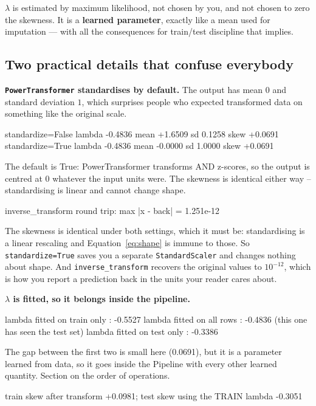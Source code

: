 \documentclass[11pt]{article}
\begin{document}
\begin{keyidea}
$\lambda$ is estimated by maximum likelihood, not chosen by you, and not chosen
to zero the skewness. It is a \textbf{learned parameter}, exactly like a mean
used for imputation --- with all the consequences for train/test discipline
that implies.
\end{keyidea}

\subsection{Two practical details that confuse everybody}

\textbf{\texttt{PowerTransformer} standardises by default.} The output has mean
$0$ and standard deviation $1$, which surprises people who expected transformed
data on something like the original scale.

\begin{codeout}
standardize=False  lambda -0.4836   mean    +1.6509   sd   0.1258   skew +0.0691
standardize=True   lambda -0.4836   mean    -0.0000   sd   1.0000   skew +0.0691

The default is True: PowerTransformer transforms AND z-scores, so the
output is centred at 0 whatever the input units were.  The skewness is
identical either way -- standardising is linear and cannot change shape.

inverse_transform round trip: max |x - back| = 1.251e-12
\end{codeout}

The skewness is identical under both settings, which it must be: standardising
is a linear rescaling and Equation~\eqref{eq:shape} is immune to those. So
\texttt{standardize=True} saves you a separate \texttt{StandardScaler} and
changes nothing about shape. And \texttt{inverse\_transform} recovers the
original values to $10^{-12}$, which is how you report a prediction back in
the units your reader cares about.

\textbf{$\lambda$ is fitted, so it belongs inside the pipeline.}

\begin{codeout}
lambda fitted on train only : -0.5527
lambda fitted on all rows   : -0.4836   (this one has seen the test set)
lambda fitted on test only  : -0.3386

The gap between the first two is small here (0.0691), but it is a
parameter learned from data, so it goes inside the Pipeline with
every other learned quantity.  Section on the order of operations.

train skew after transform +0.0981;  test skew using the TRAIN lambda -0.3051
\end{codeout}
\end{document}

